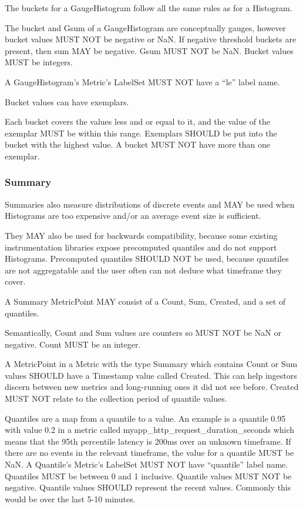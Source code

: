 \documentclass[a4paper,12pt,notitlepage,twoside,openright]{article}
\begin{document}
The buckets for a GaugeHistogram follow all the same rules as for a
Histogram.

The bucket and Gsum of a GaugeHistogram are conceptually gauges, however
bucket values MUST NOT be negative or NaN. If negative threshold buckets
are present, then sum MAY be negative. Gsum MUST NOT be NaN. Bucket
values MUST be integers.

A GaugeHistogram's Metric's LabelSet MUST NOT have a ``le'' label name.

Bucket values can have exemplars.

Each bucket covers the values less and or equal to it, and the value of
the exemplar MUST be within this range. Exemplars SHOULD be put into the
bucket with the highest value. A bucket MUST NOT have more than one
exemplar.

\hypertarget{summary}{%
\subsubsection{Summary}\label{summary}}

Summaries also measure distributions of discrete events and MAY be used
when Histograms are too expensive and/or an average event size is
sufficient.

They MAY also be used for backwards compatibility, because some existing
instrumentation libraries expose precomputed quantiles and do not
support Histograms. Precomputed quantiles SHOULD NOT be used, because
quantiles are not aggregatable and the user often can not deduce what
timeframe they cover.

A Summary MetricPoint MAY consist of a Count, Sum, Created, and a set of
quantiles.

Semantically, Count and Sum values are counters so MUST NOT be NaN or
negative. Count MUST be an integer.

A MetricPoint in a Metric with the type Summary which contains Count or
Sum values SHOULD have a Timestamp value called Created. This can help
ingestors discern between new metrics and long-running ones it did not
see before. Created MUST NOT relate to the collection period of quantile
values.

Quantiles are a map from a quantile to a value. An example is a quantile
0.95 with value 0.2 in a metric called
myapp\_http\_request\_duration\_seconds which means that the 95th
percentile latency is 200ms over an unknown timeframe. If there are no
events in the relevant timeframe, the value for a quantile MUST be NaN.
A Quantile's Metric's LabelSet MUST NOT have ``quantile'' label name.
Quantiles MUST be between 0 and 1 inclusive. Quantile values MUST NOT be
negative. Quantile values SHOULD represent the recent values. Commonly
this would be over the last 5-10 minutes.
\end{document}

